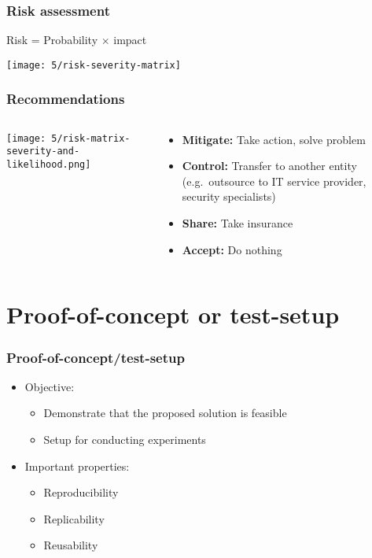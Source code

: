 \documentclass[aspectratio=169]{beamer}
\begin{document}
\begin{frame}
    \frametitle{Risk assessment}
    
    \centering
    
    Risk = Probability $\times$ impact
    
    \texttt{[image: 5/risk-severity-matrix]}
    
\end{frame}

\begin{frame}
    \frametitle{Recommendations}
    
    \begin{columns}
        \begin{column}{.5\textwidth}
            \texttt{[image: 5/risk-matrix-severity-and-likelihood.png]}
        \end{column}
        
        \begin{column}{.5\textwidth}
            \begin{itemize}
              \item \textbf{Mitigate:} Take action, solve problem
              \item \textbf{Control:} Transfer to another entity (e.g.\ outsource to IT service provider, security specialists)
              \item \textbf{Share:} Take insurance
              \item \textbf{Accept:} Do nothing
            \end{itemize}
        \end{column}
    \end{columns}    
\end{frame}


\section{Proof-of-concept or test-setup}

\begin{frame}
  \frametitle{Proof-of-concept/test-setup}

  \begin{itemize}
    \item Objective:
    \begin{itemize}
        \item Demonstrate that the proposed solution is feasible
        \item Setup for conducting experiments
    \end{itemize}
    \item Important properties:
    \begin{itemize}
        \item Reproducibility
        \item Replicability
        \item Reusability
    \end{itemize}
  \end{itemize}

\end{frame}
\end{document}
